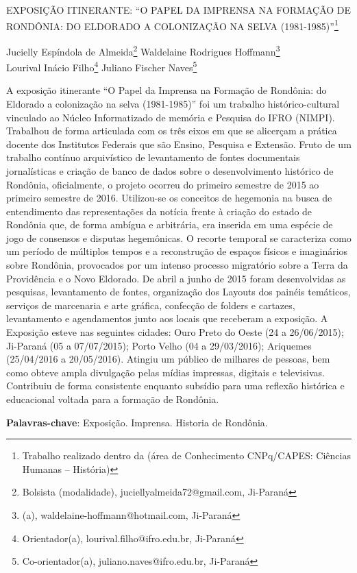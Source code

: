 \documentclass[article,12pt,onesidea,4paper,english,brazil]{abntex2}
\begin{document}
	
	
	\frenchspacing 
	
	\begin{center}
		\LARGE EXPOSIÇÃO ITINERANTE: ``O PAPEL DA IMPRENSA NA FORMAÇÃO DE RONDÔNIA: DO ELDORADO A COLONIZAÇÃO NA SELVA (1981-1985)''\footnote{Trabalho realizado dentro da (área de Conhecimento CNPq/CAPES: Ciências Humanas – História)}
		
		\normalsize
		Jucielly Espíndola de Almeida\footnote{Bolsista (modalidade), juciellyalmeida72@gmail.com, Ji-Paraná} 
		Waldelaine Rodrigues Hoffmann\footnote{(a), waldelaine-hoffmann@hotmail.com, Ji-Paraná} \\
		Lourival Inácio Filho\footnote{Orientador(a), lourival.filho@ifro.edu.br,  Ji-Paraná} 
		Juliano Fischer Naves\footnote{Co-orientador(a), juliano.naves@ifro.edu.br, Ji-Paraná} 
	\end{center}
	
	\noindent A exposição itinerante “O Papel da Imprensa na Formação de Rondônia: do Eldorado a colonização na selva (1981-1985)” foi um trabalho histórico-cultural vinculado ao Núcleo Informatizado de memória e Pesquisa do IFRO (NIMPI). Trabalhou de forma articulada com os três eixos em que se alicerçam a prática docente dos Institutos Federais que são Ensino, Pesquisa e Extensão. Fruto de um trabalho contínuo arquivístico de levantamento de fontes documentais jornalísticas e criação de banco de dados sobre o desenvolvimento histórico de Rondônia, oficialmente, o projeto ocorreu do primeiro semestre de 2015 ao primeiro semestre de 2016. Utilizou-se os conceitos de hegemonia na busca de entendimento das representações da notícia frente à criação do estado de Rondônia que, de forma ambígua e arbitrária, era inserida em uma espécie de jogo de consensos e disputas hegemônicas. O recorte temporal se caracteriza como um período de múltiplos tempos e a reconstrução de espaços físicos e imaginários sobre Rondônia, provocados por um intenso processo migratório sobre a Terra da Providência e o Novo Eldorado. De abril a junho de 2015 foram desenvolvidas as pesquisas, levantamento de fontes, organização dos Layouts dos painéis temáticos, serviços de marcenaria e arte gráfica, confecção de folders e cartazes, levantamento e agendamentos junto aos locais que receberam a exposição. A Exposição esteve nas seguintes cidades: Ouro Preto do Oeste (24 a 26/06/2015); Ji-Paraná (05 a 07/07/2015); Porto Velho (04 a 29/03/2016); Ariquemes (25/04/2016 a 20/05/2016). Atingiu um público de milhares de pessoas, bem como obteve ampla divulgação pelas mídias impressas, digitais e televisivas. Contribuiu de forma consistente enquanto subsídio para uma reflexão histórica e educacional voltada para a formação de Rondônia.
	
	\vspace{\onelineskip}
	
	\noindent
	\textbf{Palavras-chave}: Exposição. Imprensa. Historia de Rondônia.
	
\end{document}
